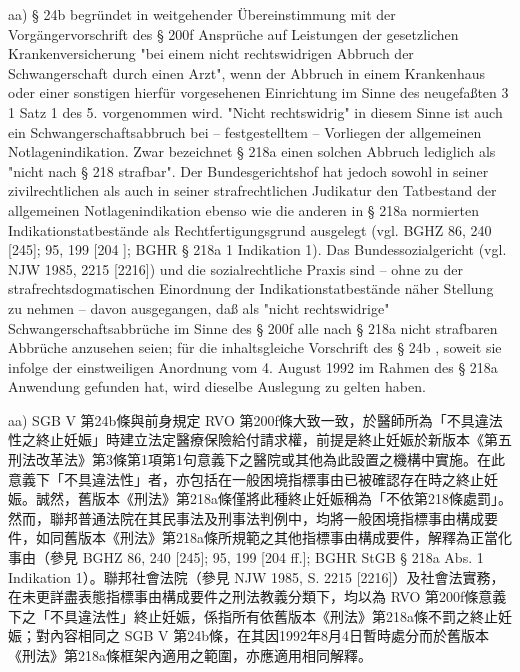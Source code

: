 \documentclass[12pt]{article}
\begin{document}
\begin{sourcepara}[title={原文E.229}]
aa) § 24b \abbrSGBV{} begründet in weitgehender Übereinstimmung mit der Vorgängervorschrift des § 200f \abbrRVO{} Ansprüche auf Leistungen der gesetzlichen Krankenversicherung "bei einem nicht rechtswidrigen Abbruch der Schwangerschaft durch einen Arzt", wenn der Abbruch in einem Krankenhaus oder einer sonstigen hierfür vorgesehenen Einrichtung im Sinne des neugefaßten \abbrArt{} 3 \abbrAbs{} 1 Satz 1 des 5. \abbrStrRG{} vorgenommen wird. "Nicht rechtswidrig" in diesem Sinne ist auch ein Schwangerschaftsabbruch bei -- festgestelltem -- Vorliegen der allgemeinen Notlagenindikation. Zwar bezeichnet § 218a \abbrStGB{} \abbrAF{} einen solchen Abbruch lediglich als "nicht nach § 218 strafbar". Der Bundesgerichtshof hat jedoch sowohl in seiner zivilrechtlichen als auch in seiner strafrechtlichen Judikatur den Tatbestand der allgemeinen Notlagenindikation ebenso wie die anderen in § 218a \abbrStGB{} \abbrAF{} normierten Indikationstatbestände als Rechtfertigungsgrund ausgelegt (vgl. BGHZ 86, 240 [245]; 95, 199 [204 \abbrFF{}]; BGHR \abbrStGB{} § 218a \abbrAbs{} 1 Indikation 1). Das Bundessozialgericht (vgl. NJW 1985, \abbrS{} 2215 [2216]) und die sozialrechtliche Praxis sind -- ohne zu der strafrechtsdogmatischen Einordnung der Indikationstatbestände näher Stellung zu nehmen -- davon ausgegangen, daß als "nicht rechtswidrige" Schwangerschaftsabbrüche im Sinne des § 200f \abbrRVO{} alle nach § 218a \abbrStGB{} \abbrAF{} nicht strafbaren Abbrüche anzusehen seien; für die inhaltsgleiche Vorschrift des § 24b \abbrSGBV{}, soweit sie infolge der einstweiligen Anordnung vom 4. August 1992 im Rahmen des § 218a \abbrStGB{} \abbrAF{} Anwendung gefunden hat, wird dieselbe Auslegung zu gelten haben.
\end{sourcepara}
\begin{transpara}
aa) SGB V 第24b條與前身規定 RVO 第200f條大致一致，於醫師所為「不具違法性之終止妊娠」時建立法定醫療保險給付請求權，前提是終止妊娠於新版本《第五刑法改革法》第3條第1項第1句意義下之醫院或其他為此設置之機構中實施。在此意義下「不具違法性」者，亦包括在一般困境指標事由已被確認存在時之終止妊娠。誠然，舊版本《刑法》第218a條僅將此種終止妊娠稱為「不依第218條處罰」。然而，聯邦普通法院在其民事法及刑事法判例中，均將一般困境指標事由構成要件，如同舊版本《刑法》第218a條所規範之其他指標事由構成要件，解釋為正當化事由（參見 BGHZ 86, 240 [245]; 95, 199 [204 ff.]; BGHR StGB § 218a Abs. 1 Indikation 1）。聯邦社會法院（參見 NJW 1985, S. 2215 [2216]）及社會法實務，在未更詳盡表態指標事由構成要件之刑法教義分類下，均以為 RVO 第200f條意義下之「不具違法性」終止妊娠，係指所有依舊版本《刑法》第218a條不罰之終止妊娠；對內容相同之 SGB V 第24b條，在其因1992年8月4日暫時處分而於舊版本《刑法》第218a條框架內適用之範圍，亦應適用相同解釋。
\end{transpara}
\end{document}
